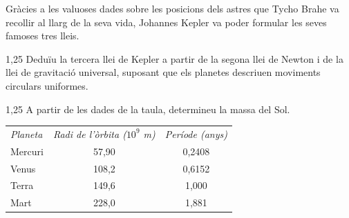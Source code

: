 Gràcies a les valuoses dades sobre les posicions dels astres que Tycho Brahe va recollir al
llarg de la seva vida, Johannes Kepler va poder formular les seves famoses tres lleis.

\begin{apartat}{1,25}
Deduïu la tercera llei de Kepler a partir de la segona llei de Newton i de la llei de
gravitació universal, suposant que els planetes descriuen moviments circulars uniformes.
\end{apartat}

\begin{apartat}{1,25}
A partir de les dades de la taula, determineu la massa del Sol.

\begin{center}
\begin{tabular}{lcc}
\textit{Planeta} & \textit{Radi de l'òrbita ($10^{9}$ m)} & \textit{Període (anys)} \\
Mercuri & 57,90 & 0,2408 \\
Venus & 108,2 & 0,6152 \\
Terra & 149,6 & 1,000 \\
Mart & 228,0 & 1,881 \\
\end{tabular}
\end{center}
\end{apartat}

